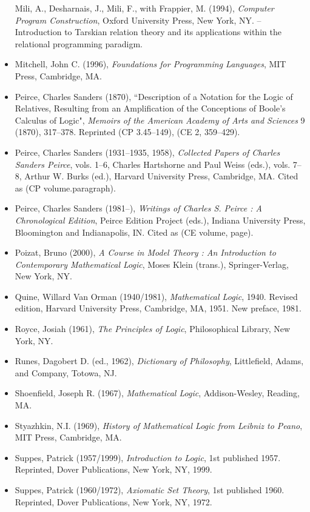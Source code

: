 \documentclass[12pt]{article}
\begin{document}
\begin{itemize}
Mili, A., Desharnais, J., Mili, F., with Frappier, M. (1994), \textit{Computer Program Construction}, Oxford University Press, New York, NY. -- Introduction to Tarskian relation theory and its applications within the relational programming paradigm.
\item
Mitchell, John C. (1996), \textit{Foundations for Programming Languages}, MIT Press, Cambridge, MA.
\item
Peirce, Charles Sanders (1870), ``Description of a Notation for the Logic of Relatives, Resulting from an Amplification of the Conceptions of Boole's Calculus of Logic", \textit{Memoirs of the American Academy of Arts and Sciences} 9 (1870), 317--378.  Reprinted (CP 3.45--149), (CE 2, 359--429).
\item
Peirce, Charles Sanders (1931--1935, 1958), \textit{Collected Papers of Charles Sanders Peirce}, vols. 1--6, Charles Hartshorne and Paul Weiss (eds.), vols. 7--8, Arthur W. Burks (ed.), Harvard University Press, Cambridge, MA.  Cited as (CP volume.paragraph).
\item
Peirce, Charles Sanders (1981--), \textit{Writings of Charles S. Peirce : A Chronological Edition}, Peirce Edition Project (eds.), Indiana University Press, Bloomington and Indianapolis, IN.  Cited as (CE volume, page).
\item
Poizat, Bruno (2000), \textit{A Course in Model Theory : An Introduction to Contemporary Mathematical Logic}, Moses Klein (trans.), Springer-Verlag, New York, NY.
\item
Quine, Willard Van Orman (1940/1981), \textit{Mathematical Logic}, 1940.  Revised edition, Harvard University Press, Cambridge, MA, 1951.  New preface, 1981.
\item
Royce, Josiah (1961), \textit{The Principles of Logic}, Philosophical Library, New York, NY.
\item
Runes, Dagobert D. (ed., 1962), \textit{Dictionary of Philosophy}, Littlefield, Adams, and Company, Totowa, NJ.
\item
Shoenfield, Joseph R. (1967), \textit{Mathematical Logic}, Addison-Wesley, Reading, MA.
\item
Styazhkin, N.I. (1969), \textit{History of Mathematical Logic from Leibniz to Peano}, MIT Press, Cambridge, MA.
\item
Suppes, Patrick (1957/1999), \textit{Introduction to Logic}, 1st published 1957.  Reprinted, Dover Publications, New York, NY, 1999.
\item
Suppes, Patrick (1960/1972), \textit{Axiomatic Set Theory}, 1st published 1960.  Reprinted, Dover Publications, New York, NY, 1972.

\end{itemize}
\end{document}

